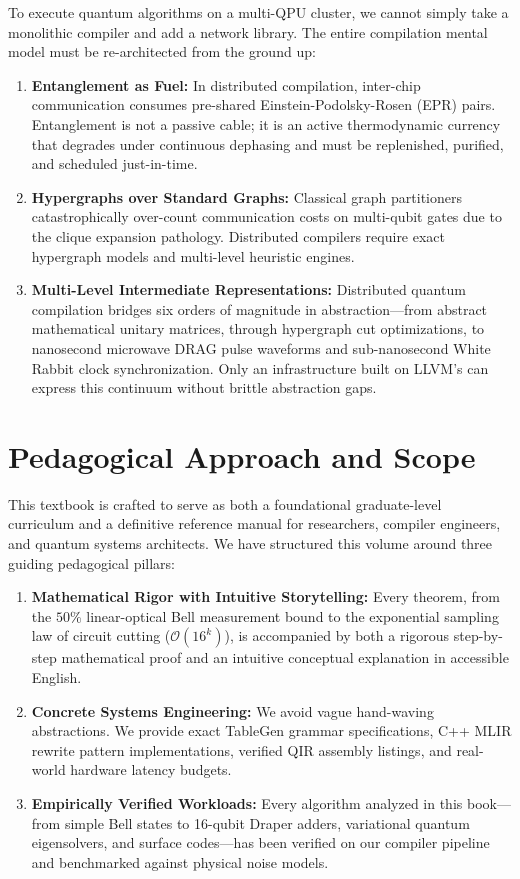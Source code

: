 To execute quantum algorithms on a multi-QPU cluster, we cannot simply take a monolithic compiler and add a network library. The entire compilation mental model must be re-architected from the ground up:
\begin{enumerate}
    \item \textbf{Entanglement as Fuel:} In distributed compilation, inter-chip communication consumes pre-shared Einstein-Podolsky-Rosen (EPR) pairs. Entanglement is not a passive cable; it is an active thermodynamic currency that degrades under continuous dephasing and must be replenished, purified, and scheduled just-in-time.
    \item \textbf{Hypergraphs over Standard Graphs:} Classical graph partitioners catastrophically over-count communication costs on multi-qubit gates due to the clique expansion pathology. Distributed compilers require exact hypergraph models and multi-level heuristic engines.
    \item \textbf{Multi-Level Intermediate Representations:} Distributed quantum compilation bridges six orders of magnitude in abstraction---from abstract mathematical unitary matrices, through hypergraph cut optimizations, to nanosecond microwave DRAG pulse waveforms and sub-nanosecond White Rabbit clock synchronization. Only an infrastructure built on LLVM's  can express this continuum without brittle abstraction gaps.
\end{enumerate}

\section*{Pedagogical Approach and Scope}
This textbook is crafted to serve as both a foundational graduate-level curriculum and a definitive reference manual for researchers, compiler engineers, and quantum systems architects. We have structured this volume around three guiding pedagogical pillars:
\begin{enumerate}
    \item \textbf{Mathematical Rigor with Intuitive Storytelling:} Every theorem, from the $50\%$ linear-optical Bell measurement bound to the exponential sampling law of circuit cutting ($\mathcal{O}(16^k)$), is accompanied by both a rigorous step-by-step mathematical proof and an intuitive conceptual explanation in accessible English.
    \item \textbf{Concrete Systems Engineering:} We avoid vague hand-waving abstractions. We provide exact TableGen grammar specifications, C++ MLIR rewrite pattern implementations, verified QIR assembly listings, and real-world hardware latency budgets.
    \item \textbf{Empirically Verified Workloads:} Every algorithm analyzed in this book---from simple Bell states to 16-qubit Draper adders, variational quantum eigensolvers, and surface codes---has been verified on our compiler pipeline and benchmarked against physical noise models.
\end{enumerate}

